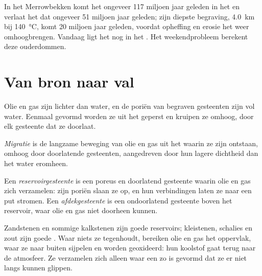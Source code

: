 In het Merrowbekken komt het  ongeveer 117 miljoen jaar geleden in het 
en verlaat het dat ongeveer 51 miljoen jaar geleden; zijn diepste
begraving, \qty{4.0}{km} bij \qty{140}{\degreeCelsius}, komt 20 miljoen jaar
geleden, voordat opheffing en erosie het weer omhoogbrengen. Vandaag ligt het nog in het
. Het weekendprobleem berekent deze ouderdommen.

\section{Van bron naar val}

Olie en gas zijn lichter dan water, en de poriën van begraven gesteenten zijn vol
water. Eenmaal gevormd worden ze uit het  geperst en kruipen ze omhoog,
door elk gesteente dat ze doorlaat.

\begin{definition}[Migratie]\label{def:g11:fossil-fuel-geology:migration}
\emph{Migratie} is de langzame beweging van
olie en gas uit het  waarin ze zijn ontstaan, omhoog door
doorlatende gesteenten, aangedreven door hun lagere dichtheid dan het water eromheen.
\end{definition}

\begin{definition}\label{def:g11:fossil-fuel-geology:reservoir}
Een \emph{reservoirgesteente} is een poreus en doorlatend
gesteente waarin olie en gas zich verzamelen: zijn poriën slaan ze op, en hun verbindingen
laten ze naar een put stromen. Een \emph{afdekgesteente} is een
ondoorlatend gesteente boven het reservoir, waar olie en gas niet
doorheen kunnen.
\end{definition}

Zandstenen en sommige kalkstenen zijn goede reservoirs; kleistenen, schalies en
zout zijn goede . Waar niets ze tegenhoudt, bereiken olie en gas het
oppervlak, waar ze naar buiten sijpelen en worden geoxideerd: hun koolstof gaat terug naar de
atmosfeer. Ze verzamelen zich alleen waar een  zo is gevormd dat ze er
niet langs kunnen glippen.

